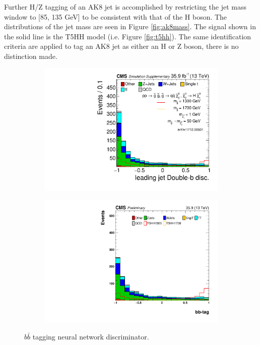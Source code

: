 Further H/Z tagging of an AK8 jet is accomplished by restricting the jet mass window to [85, 135 GeV] to be consistent with that of the H boson. The distributions of the jet mass are seen in Figure \ref{fig:ak8mass}. The signal shown in the solid line is the T5HH model (i.e. Figure \ref{fig:t5hh}). The same identification criteria are applied to tag an AK8 jet as either an H or Z boson, there is no distinction made.

\begin{figure}
\begin{subfigure}[b]{0.5\textwidth}
\centering
\includegraphics[width=\textwidth]{figs/SUS17006/J1BB_LooseJetMass.pdf}
\end{subfigure}
\begin{subfigure}[b]{0.5\textwidth}
\centering
\includegraphics[width=\textwidth]{figs/SUS17006/J2pt_BBtag_baseline.pdf} 
\end{subfigure}
\caption{$b\bar{b}$ tagging neural network discriminator.}
\label{fig:ak8bb}
\end{figure}

